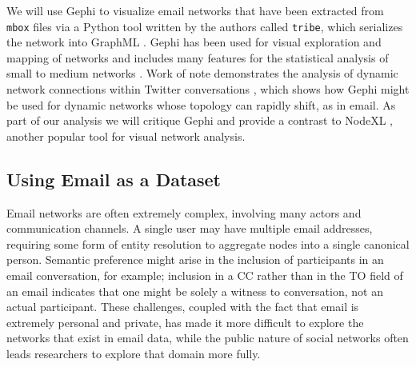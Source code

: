 \documentclass[11pt,letterpaper]{article}
\begin{document}
We will use Gephi \cite{gephi_gephi-open_2010} to visualize email networks that have been extracted from \texttt{mbox} files via a Python tool written by the authors called \texttt{tribe}, which serializes the network into GraphML \cite{brandes_graph_2010}. Gephi has been used for visual exploration and mapping of networks \cite{bastian_gephi:_2009} and includes many features for the statistical analysis of small to medium networks \cite{mcsweeney_gephi_2009}. Work of note demonstrates the analysis of dynamic network connections within Twitter conversations \cite{bruns_how_2012}, which shows how Gephi might be used for dynamic networks whose topology can rapidly shift, as in email. As part of our analysis we will critique Gephi and provide a contrast to NodeXL \cite{smith_nodexl:_2010}, another popular tool for visual network analysis.

\subsection*{Using Email as a Dataset}

Email networks are often extremely complex, involving many actors and communication channels. A single user may have multiple email addresses, requiring some form of entity resolution to aggregate nodes into a single canonical person. Semantic preference might arise in the inclusion of participants in an email conversation, for example; inclusion in a CC rather than in the TO field of an email indicates that one might be solely a witness to conversation, not an actual participant. These challenges, coupled with the fact that email is extremely personal and private, has made it more difficult to explore the networks that exist in email data, while the public nature of social networks often leads researchers to explore that domain more fully.
\end{document}
